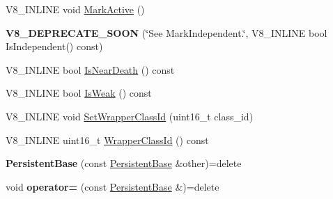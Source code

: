 \begin{DoxyCompactItemize}
\item 
V8\+\_\+\+I\+N\+L\+I\+NE void \mbox{\hyperlink{classv8_1_1PersistentBase_a7244edd33a45b7d95e566fce85e3f87d}{Mark\+Active}} ()
\item 
\mbox{\label{classv8_1_1PersistentBase_a65a640cf38fa04620eff99b1c4e2d221}} 
{\bfseries V8\+\_\+\+D\+E\+P\+R\+E\+C\+A\+T\+E\+\_\+\+S\+O\+ON} (\char`\"{}See Mark\+Independent.\char`\"{}, V8\+\_\+\+I\+N\+L\+I\+NE bool Is\+Independent() const)
\item 
V8\+\_\+\+I\+N\+L\+I\+NE bool \mbox{\hyperlink{classv8_1_1PersistentBase_a6587b66b7d4c0397129c51d0507b4094}{Is\+Near\+Death}} () const
\item 
V8\+\_\+\+I\+N\+L\+I\+NE bool \mbox{\hyperlink{classv8_1_1PersistentBase_a479c7b146da083aa608e133a7dec79f9}{Is\+Weak}} () const
\item 
V8\+\_\+\+I\+N\+L\+I\+NE void \mbox{\hyperlink{classv8_1_1PersistentBase_ac4c979164b3ed4dc92319e6f5a108d3d}{Set\+Wrapper\+Class\+Id}} (uint16\+\_\+t class\+\_\+id)
\item 
V8\+\_\+\+I\+N\+L\+I\+NE uint16\+\_\+t \mbox{\hyperlink{classv8_1_1PersistentBase_ac81668d70faff8ee84aa6db410b3ce3c}{Wrapper\+Class\+Id}} () const
\item 
\mbox{\label{classv8_1_1PersistentBase_aa403ece93fda904f5d6ab39e9383a504}} 
{\bfseries Persistent\+Base} (const \mbox{\hyperlink{classv8_1_1PersistentBase}{Persistent\+Base}} \&other)=delete
\item 
\mbox{\label{classv8_1_1PersistentBase_ada3d83b8cadaf4b83027baa41cd99d8c}} 
void {\bfseries operator=} (const \mbox{\hyperlink{classv8_1_1PersistentBase}{Persistent\+Base}} \&)=delete
\end{DoxyCompactItemize}
